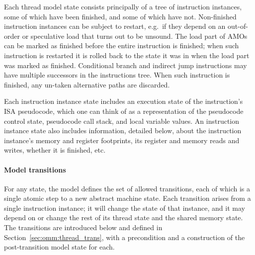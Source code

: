 Each thread model state consists principally of a tree of instruction instances, some of which have been finished, and some of which have not.
Non-finished instruction instances can be subject to restart, e.g.~if they depend on an out-of-order or speculative load that turns out to be unsound.
The load part of AMOs can be marked as finished before the entire instruction is finished; when such instruction is restarted it is rolled back to the state it was in when the load part was marked as finished.
Conditional branch and indirect jump instructions may have multiple successors in the instructions tree.
When such instruction is finished, any un-taken alternative paths are discarded.

Each instruction instance state includes an execution state of the instruction's ISA pseudocode, which one can think of as a representation of the pseudocode control state, pseudocode call stack, and local variable values. 
%
An instruction instance state also includes information, detailed below, about the instruction instance's memory and register footprints, its register and memory reads and writes, whether it is finished, etc.

\paragraph{Model transitions}
For any state, the model defines the set of allowed transitions, each of which is a single atomic step to a new abstract machine state.
Each transition arises from a single instruction instance; it will change the state of that instance, and it may depend on or change the rest of its thread state and the shared memory state.
The transitions are introduced below and defined in Section~\ref{sec:omm:thread_trans}, with a precondition and a construction of the post-transition model state for each.

